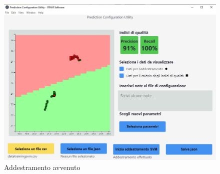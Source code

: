 	\begin{figure}[H] 	
		\begin{center}
			\includegraphics[width=\linewidth]{img/4.jpg}
		\end{center}
		\caption{Addestramento avvenuto}	
	\end{figure}
	
